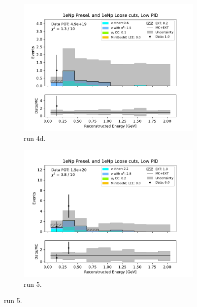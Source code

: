 \begin{figure}
\begin{subfigure}{0.33\linewidth}
        \includegraphics[width=\linewidth]{technote/Sidebands/Figures/FarSideband/far_sideband_reco_e_run4d_NP_NPL_LOW_PID.pdf}
        \caption{run 4d.}
    \end{subfigure}%
    \begin{subfigure}{0.33\linewidth}
        \includegraphics[width=\linewidth]{technote/Sidebands/Figures/FarSideband/far_sideband_reco_e_run5_NP_NPL_LOW_PID.pdf}
        \caption{run 5.}
    \end{subfigure}
\end{figure}

